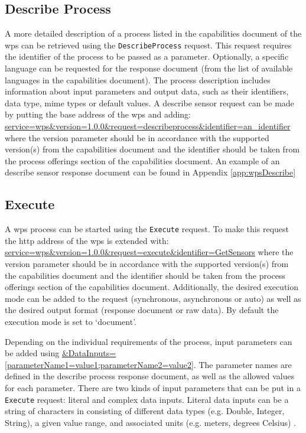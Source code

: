 \subsection{Describe Process}
\begin{sloppypar}
A more detailed description of a process listed in the capabilities document of the \ac{wps} can be retrieved using the \texttt{DescribeProcess} request. This request requires the identifier of the process to be passed as a parameter. Optionally, a specific language can be requested for the response document (from the list of available languages in the capabilities document). The process description includes information about input parameters and output data, such as their identifiers, data type, mime types or default values. A describe sensor request can be made by putting the base address of the \ac{wps} and adding: \url{service=wps&version=1.0.0&request=describeprocess&identifier=an_identifier} where the version parameter should be in accordance with the supported version(s) from the capabilities document and the identifier should be taken from the process offerings section of the capabilities document. An example of an describe sensor response document can be found in Appendix \ref{app:wpsDescribe}  
\end{sloppypar}


\subsection{Execute}
A \ac{wps} process can be started using the \texttt{Execute} request. To make this request the \ac{http} address of the \ac{wps} is extended with: \url{service=wps&version=1.0.0&request=execute&identifier=GetSensors} where the version parameter should be in accordance with the supported version(s) from the capabilities document and the identifier should be taken from the process offerings section of the capabilities document. Additionally, the desired execution mode can be added to the request (synchronous, asynchronous or auto) as well as the desired output format (response document or raw data). By default the execution mode is set to `document'.

\begin{sloppypar}
	Depending on the individual requirements of the process, input parameters can be added using \url{&DataInputs=[parameterName1=value1;parameterName2=value2]}. The parameter names are defined in the describe process response document, as well as the allowed values for each parameter. There are two kinds of input parameters that can be put in a \texttt{Execute} request: literal and complex data inputs. Literal data inputs can be a string of characters in consisting of different data types (e.g. Double, Integer, String), a given value range, and associated units (e.g. meters, degrees Celsius) \citep[p. 36]{GEO:OGC}. 
\end{sloppypar} 

